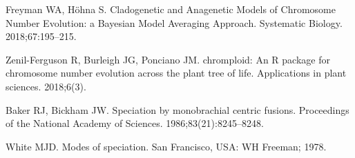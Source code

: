 \documentclass[]{rsos}%
\begin{document}
\begin{thebibliography}{9}
Freyman WA, H{\"o}hna S.
 Cladogenetic and Anagenetic Models of Chromosome Number Evolution: a
  {B}ayesian Model Averaging Approach.
 Systematic Biology. 2018;67:195--215.

Zenil-Ferguson R, Burleigh JG, Ponciano JM.
 chromploid: An R package for chromosome number evolution across the
  plant tree of life.
 Applications in plant sciences. 2018;6(3).

Baker RJ, Bickham JW.
 Speciation by monobrachial centric fusions.
 Proceedings of the National Academy of Sciences.
  1986;83(21):8245--8248.

White MJD.
 Modes of speciation.
 San Francisco, USA: WH Freeman; 1978.

\end{thebibliography}
\end{document}
